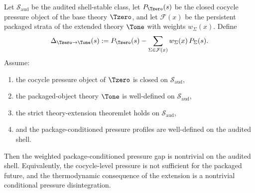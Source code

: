 \begin{theorem}\label{thm:conditional-disintegration}
Let \(\mathcal{S}_{\mathrm{aud}}\) be the audited shell-stable class, let \(P_{\Tzero}(s)\) be the closed cocycle pressure object of the base theory \(\Tzero\), and let \(\mathcal{F}(x)\) be the persistent packaged strata of the extended theory \(\Tone\) with weights \(w_{\Sigma}(x)\). Define
\[
\Delta_{\Tzero\to \Tone}(s)
:=
P_{\Tzero}(s)
-
\sum_{\Sigma\in\mathcal{F}(x)} w_{\Sigma}(x)\,P_{\Sigma}(s).
\]
Assume:
\begin{enumerate}
    \item the cocycle pressure object of \(\Tzero\) is closed on \(\mathcal{S}_{\mathrm{aud}}\),
    \item the packaged-object theory \(\Tone\) is well-defined on \(\mathcal{S}_{\mathrm{aud}}\),
    \item the strict theory-extension theoremlet holds on \(\mathcal{S}_{\mathrm{aud}}\),
    \item and the package-conditioned pressure profiles are well-defined on the audited shell.
\end{enumerate}
Then the weighted package-conditioned pressure gap is nontrivial on the audited shell. Equivalently, the cocycle-level pressure is not sufficient for the packaged future, and the thermodynamic consequence of the extension is a nontrivial conditional pressure disintegration.
\end{theorem}

